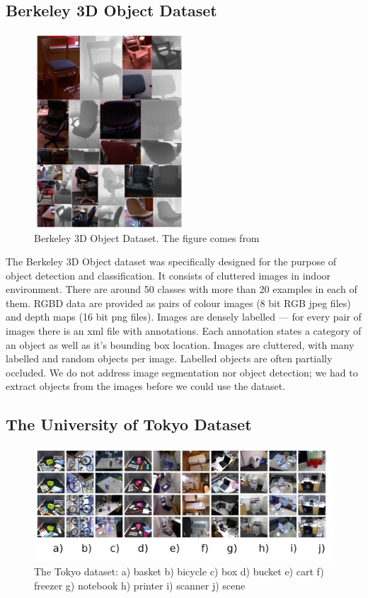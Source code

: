	\subsection{Berkeley 3D Object Dataset}
	\begin{figure}[!ht]
	\centering
	\includegraphics[width=0.5\textwidth]{figs/b3do_dataset}
	\caption{Berkeley 3D Object Dataset. The figure comes from \cite{B3DO}}
	\label{fig:b3do}
	\end{figure}
	
	The Berkeley 3D Object dataset was specifically designed for the purpose of object detection and classification. It consists of cluttered images in indoor environment. There are around 50 classes with more than 20 examples in each of them. RGBD data are provided as pairs of colour images (8 bit RGB jpeg files) and depth maps (16 bit png files). Images are densely labelled --- for every pair of images there is an xml file with annotations. Each annotation states a category of an object as well as it's bounding box location. Images are cluttered, with many labelled and random objects per image. Labelled objects are often partially occluded. We do not address image segmentation nor object detection; we had to extract objects from the images before we could use the dataset.

	\subsection{The University of Tokyo Dataset}	
	\begin{figure}[!ht]
	\centering
	\includegraphics[width=1\textwidth]{figs/tokyo_horizontal}
	\caption{The Tokyo dataset: a) basket b) bicycle c) box d) bucket e) cart f) freezer g) notebook h) printer i) scanner j) scene}
	\label{fig:tokyo}
	\end{figure}
	
